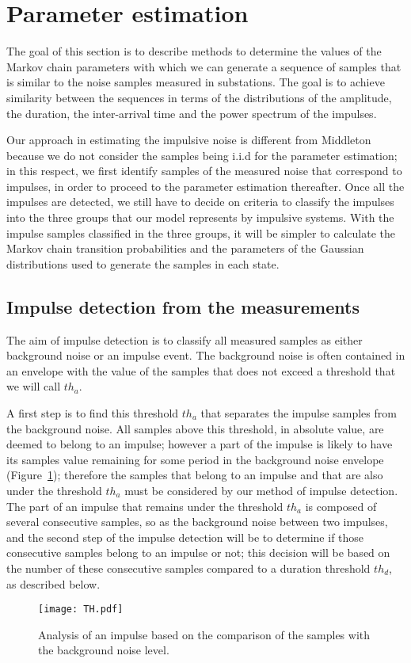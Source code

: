 \documentclass[journal]{IEEEtran}
\begin{document}
\section{Parameter estimation}
The goal of this section is to describe methods to determine the values of the Markov chain parameters with which we can generate a sequence of samples that is similar to the noise samples measured in substations. The goal is to achieve similarity between the sequences in terms of the distributions of the amplitude, the duration, the inter-arrival time and the power spectrum of the impulses.\

Our approach in estimating the impulsive noise is different from Middleton~\cite{midd1} because we do not consider the samples being i.i.d for the parameter estimation; in this respect, we first identify samples of the measured noise that correspond to impulses, in order to proceed to the parameter estimation thereafter. Once all the impulses are detected, we still have to decide on criteria to classify the impulses into the three groups that our model represents by impulsive systems. With the impulse samples classified in the three groups, it will be simpler to calculate the Markov chain transition probabilities and the parameters of the Gaussian distributions used to generate the samples in each state.
\subsection{Impulse detection from the measurements}
The aim of impulse detection is to classify all measured samples as either background noise or an impulse event. The background noise is often contained in an envelope with the value of the samples that does not exceed a threshold that we will call $th_a$.\

A first step is to find this threshold $th_a$ that separates the impulse samples from the background noise. All samples above this threshold, in absolute value, are deemed to belong to an impulse; however a part of the impulse is likely to have its samples value remaining for some period in the background noise envelope (Figure~\ref{th}); therefore the samples that belong to an impulse and that are also under the threshold $th_a$ must be considered by our method of impulse detection. The part of an impulse that remains under the threshold $th_a$ is composed of several consecutive samples, so as the background noise between two impulses, and the second step of the impulse detection will be to determine if those consecutive samples belong to an impulse or not; this decision will be based on the number of these consecutive samples compared to a duration threshold $th_d$, as described below.\
\begin{figure}
\begin{center}
  \texttt{[image: TH.pdf]}\\
\end{center}
  \caption{Analysis of an impulse based on the comparison of the samples with the background noise level.}\label{th}
\end{figure}
\end{document}
